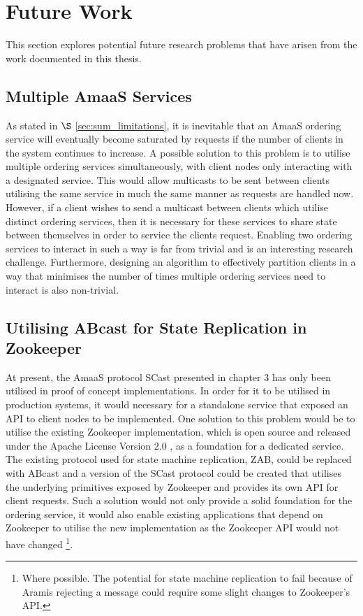 \section{Future Work}
This section explores potential future research problems that have arisen from the work documented in this thesis.

    \subsection{Multiple AmaaS Services}
    As stated in $\S$ \ref{sec:sum_limitations}, it is inevitable that an \textsf{AmaaS} ordering service will eventually become saturated by requests if the number of clients in the system continues to increase.  A possible solution to this problem is to utilise multiple ordering services simultaneously, with client nodes only interacting with a designated service.  This would allow multicasts to be sent between clients utilising the same service in much the same manner as requests are handled now.  However, if a client wishes to send a multicast between clients which utilise distinct ordering services, then it is necessary for these services to share state between themselves in order to service the clients request.  Enabling two ordering services to interact in such a way is far from trivial and is an interesting research challenge.  Furthermore, designing an algorithm to effectively partition clients in a way that minimises the number of times multiple ordering services need to interact is also non-trivial.  
        
    \subsection{Utilising ABcast for State Replication in Zookeeper}\label{sec:sum_fw_zoo}
    At present, the \textsf{AmaaS} protocol \textsf{SCast} presented in chapter 3 has only been utilised in proof of concept implementations.  In order for it to be utilised in production systems, it would necessary for a standalone service that exposed an API to client nodes to be implemented.  One solution to this problem would be to utilise the existing Zookeeper implementation, which is open source and released under the Apache License Version $2.0$ \citep{ApacheLicense}, as a foundation for a dedicated service.  The existing protocol used for state machine replication, ZAB, could be replaced with \textsf{ABcast} and a version of the \textsf{SCast} protocol could be created that utilises the underlying primitives exposed by Zookeeper and provides its own API for client requests.  Such a solution would not only provide a solid foundation for the ordering service, it would also enable existing applications that depend on Zookeeper to utilise the new implementation as the Zookeeper API would not have changed \footnote{Where possible.  The potential for state machine replication to fail because of \textsf{Aramis} rejecting a message could require some slight changes to Zookeeper's API.}.          
        
